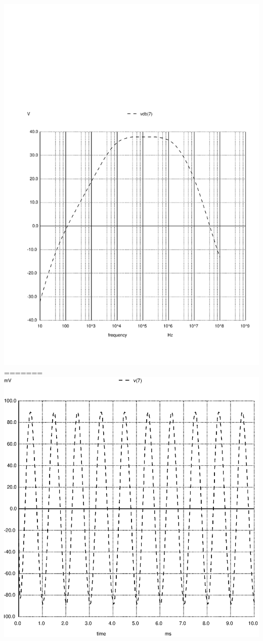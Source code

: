 \includegraphics[width=1\linewidth]{../sim/vo2f.pdf}
=======
\includegraphics[width=1\linewidth]{../sim/vo1.ps}

